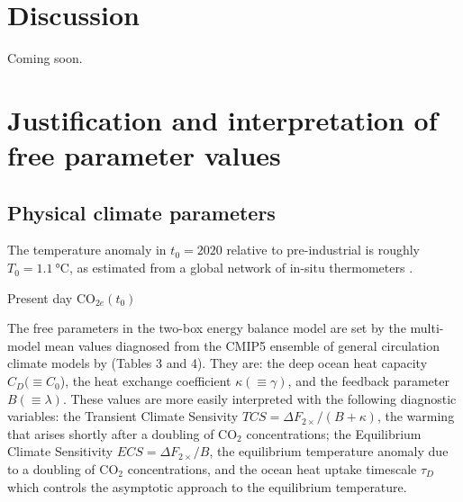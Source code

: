 \documentclass{article}
\begin{document}


\section{Discussion}

Coming soon.

\appendix
\appendixpage
\addappheadtotoc


\section{Justification and interpretation of free parameter values}\label{app.parameters}

\subsection{Physical climate parameters}
The temperature anomaly in $t_{0}=2020$ relative to pre-industrial is roughly $T_{0} = \SI{1.1}{\celsius}$, as estimated from a global network of in-situ thermometers \citep{lenssen_improvements_2019, nasagisstemp}.

Present day CO$_{2e}(t_{0})$

The free parameters in the two-box energy balance model are set by the multi-model mean values diagnosed from the CMIP5 ensemble of general circulation climate models by \cite{geoffroy_transient_2012} (Tables 3 and 4). They are: the deep ocean heat capacity $C_{D} (\equiv C_{0}$), the heat exchange coefficient $\kappa (\equiv \gamma)$, and the feedback parameter $B (\equiv \lambda)$. These values are more easily interpreted with the following diagnostic variables: the Transient Climate Sensivity $TCS = \Delta F_{2\times}/(B + \kappa)$, the warming that arises shortly after a doubling of CO$_{2}$ concentrations; the Equilibrium Climate Sensitivity $ECS = \Delta F_{2\times}/B$, the equilibrium temperature anomaly due to a doubling of CO$_{2}$ concentrations, and the ocean heat uptake timescale $\tau_{D}$ which controls the asymptotic approach to the equilibrium temperature.
\end{document}
